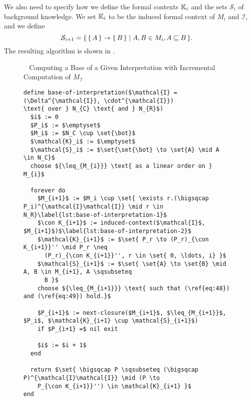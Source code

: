 We also need to specify how we define the formal contexts ${\mathbb{K}}_{i}$ and the sets
$\mathcal{S}_{i}$ of background knowledge.  We set ${\mathbb{K}}_{i}$ to be the induced formal
context of $M_{i}$ and $\mathcal{I}$, and we define
\begin{equation*}
  \mathcal{S}_{i+1} = {\{\, {\{\,A\,\}} \to {\ensuremath{\{\,B\,\}}} \mid A, B \in M_{i}, A \sqsubseteq B \,\}}.
\end{equation*}
The resulting algorithm is shown in .


\begin{figure}[tp]
  \begin{Algorithm}~ Computing a Base of a Given
    Interpretation with Incremental Computation of $M_{\mathcal{I}}$%
    \label{alg:base-of-interpretation}
    \begin{lstlisting}
define base-of-interpretation($\mathcal{I} = (\Delta^{\mathcal{I}}, \cdot^{\mathcal{I}})
\text{ over } N_{C} \text{ and } N_{R}$)
  $i$ := 0
  $P_i$ := $\emptyset$
  $M_i$ := $N_C \cup \set{\bot}$
  $\mathcal{K}_i$ := $\emptyset$
  $\mathcal{S}_i$ := $\set{\set{\bot} \to \set{A} \mid A \in N_C}$
  choose ${\leq_{M_{i}}} \text{ as a linear order on } M_{i}$

  forever do
    $M_{i+1}$ := $M_i \cup \set{ \exists r.(\bigsqcap P_i)^{\mathcal{I}\mathcal{I}} \mid r \in N_R}\label{lst:base-of-interpretation-1}$
    $\con K_{i+1}$ := induced-context($\mathcal{I}$, $M_{i+1}$)$\label{lst:base-of-interpretation-2}$
    $\mathcal{K}_{i+1}$ := $\set{ P_r \to (P_r)_{\con K_{i+1}}'' \mid P_r \neq
      (P_r)_{\con K_{i+1}}'', r \in \set{ 0, \ldots, i} }$
    $\mathcal{S}_{i+1}$ := $\set{ \set{A} \to \set{B} \mid A, B \in M_{i+1}, A \sqsubseteq
      B }$
    choose ${\leq_{M_{i+1}}} \text{ such that (\ref{eq:48}) and (\ref{eq:49}) hold.}$

    $P_{i+1}$ := next-closure($M_{i+1}$, $\leq_{M_{i+1}}$, $P_i$, $\mathcal{K}_{i+1} \cup \mathcal{S}_{i+1}$)
    if $P_{i+1} =$ nil exit

    $i$ := $i + 1$  
  end

  return $\set{ \bigsqcap P \sqsubseteq (\bigsqcap P)^{\mathcal{I}\mathcal{I}} \mid (P \to
    P_{\con K_{i+1}}'') \in \mathcal{K}_{i+1} }$
end    
    \end{lstlisting}  
  \end{Algorithm}
\end{figure}

